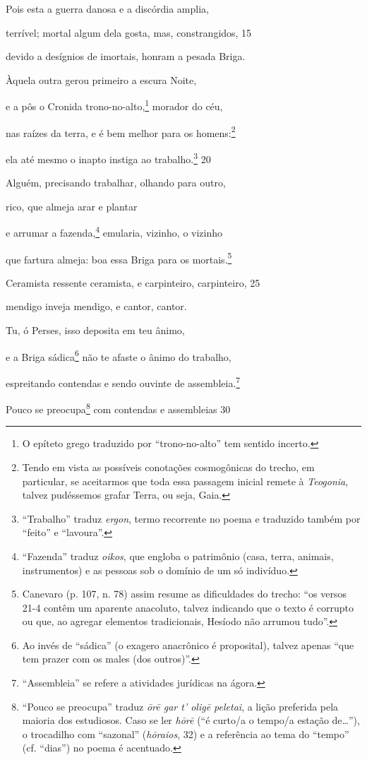 Pois esta a guerra danosa e a discórdia amplia,

terrível; mortal algum dela gosta, mas, constrangidos, \num{15}

devido a desígnios de imortais, honram a pesada Briga.

Àquela outra gerou primeiro a escura Noite,

e a pôs o Cronida trono-no-alto,\footnote{O epíteto grego traduzido por ``trono-no-alto'' tem sentido incerto.} morador do céu,

nas raízes da terra, e é bem melhor para os homens:\footnote{Tendo em vista as possíveis conotações cosmogônicas do trecho, em
particular, se aceitarmos que toda essa passagem inicial remete à
\emph{Teogonia}, talvez pudéssemos grafar Terra, ou seja, Gaia.}

ela até mesmo o inapto instiga ao trabalho.\footnote{``Trabalho'' traduz \emph{ergon}, termo recorrente no poema e traduzido também por ``feito'' e ``lavoura''.} \num{20}

Alguém, precisando trabalhar, olhando para outro,

rico, que almeja arar e plantar

e arrumar a fazenda,\footnote{``Fazenda'' traduz \emph{oikos}, que engloba o patrimônio (casa, terra, animais, instrumentos) e as pessoas sob o domínio de um só
indivíduo.} emularia, vizinho, o vizinho

que fartura almeja: boa essa Briga para os mortais.\footnote{Canevaro (p. 107, n. 78) assim resume as dificuldades do trecho:
``os versos 21-4 contêm um aparente anacoluto, talvez indicando que o
texto é corrupto ou que, ao agregar elementos tradicionais, Hesíodo não
arrumou tudo''.}

Ceramista ressente ceramista, e carpinteiro, carpinteiro, \num{25}

mendigo inveja mendigo, e cantor, cantor.

Tu, ó Perses, isso deposita em teu ânimo,

e a Briga sádica\footnote{Ao invés de ``sádica'' (o exagero anacrônico é proposital), talvez apenas ``que tem prazer com os males (dos outros)''.} não te afaste o ânimo do trabalho,

espreitando contendas e sendo ouvinte de assembleia.\footnote{``Assembleia'' se refere a atividades jurídicas na ágora.}

Pouco se preocupa\footnote{``Pouco se preocupa'' traduz \emph{ōrē gar t' oligē peletai}, a lição preferida pela maioria dos estudiosos. Caso se ler \emph{hōrē}
(``é curto/a o tempo/a estação de\ldots{}''), o trocadilho com
``sazonal'' (\emph{hōraios}, 32) e a referência ao tema do ``tempo''
(cf. ``dias'') no poema é acentuado.} com contendas e assembleias \num{30}

